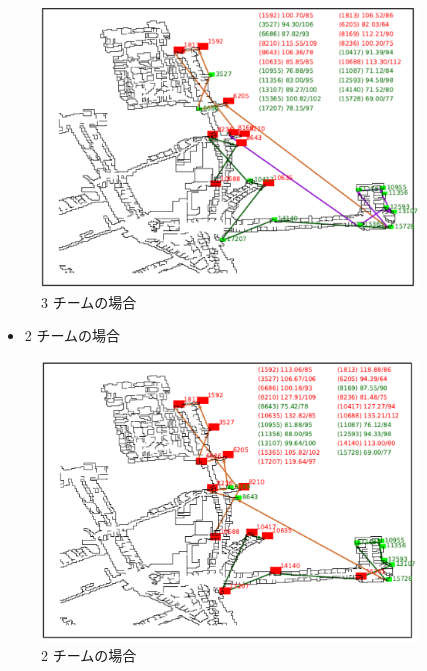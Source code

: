 \documentclass[a4paper,12pt,fleqn]{jarticle}
\begin{document}
\begin{itemize}
\begin{figure}[H]
\begin{center}
  \includegraphics[width=10cm,clip]{st64_t3_no30.pdf}
  \caption{3 チームの場合}
  \label{fig:st64_t3_no30}
  \end{center}
\end{figure}

\begin{itemize}
\item 2 チームの場合
\end{itemize}

\begin{figure}[H]
\begin{center}
  \includegraphics[width=10cm,clip]{st64_t2_no30.pdf}
  \caption{2 チームの場合}
  \label{fig:st64_t2_no30}
  \end{center}
\end{figure}


\end{itemize}
\end{document}
